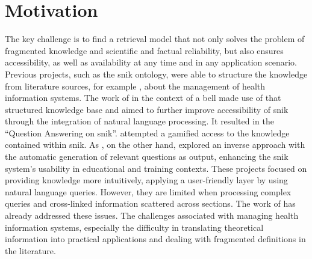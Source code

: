 \section{Motivation}\label{sec:motivation}
The key challenge is to find a retrieval model that not only solves the problem of fragmented knowledge and scientific and factual reliability, but also ensures accessibility, as well as availability at any time and in any application scenario. 
%
Previous projects, such as the \ac{snik} ontology, were able to structure the knowledge from literature sources, for example \citet{bb2}, about the management of health information systems. 
The work of \citep{hannesbell, hannesbell_skill} in the context of a \ac{bell} made use of that structured knowledge base and aimed to further improve accessibility of \ac{snik} through the integration of natural language processing.    It resulted in the \enquote{Question Answering on \ac{snik}}. \citet{snikquiz} attempted a gamified access to the knowledge contained within \ac{snik}. As \citet{arneba}, on the other hand, explored an inverse approach with the automatic generation of relevant questions as output, enhancing the \ac{snik} system's usability in educational and training contexts.
These projects focused on providing knowledge more intuitively, applying a user-friendly layer by using natural language queries.
%
However, they are limited when processing complex queries and cross-linked information scattered across sections.
The work of \citet{Paul_Keller} has already addressed these issues. The challenges associated with managing health information systems, especially the difficulty in translating theoretical information into practical applications and dealing with fragmented definitions in the literature.

